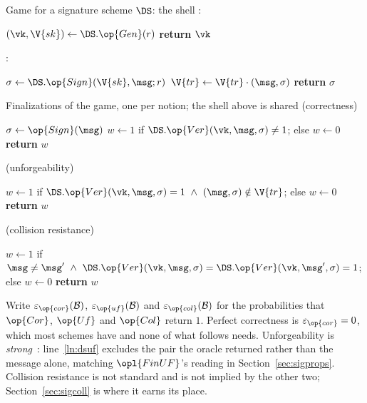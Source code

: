 \documentclass[10pt,oneside,openany]{book}
\theoremstyle{accentdef}
\theoremstyle{accentplain}
\begin{document}
\begin{procedure}{Game for a signature scheme $\DS$: the shell}
:
\begin{algorithmic}[1]
\setcounter{contline}{0}\algcont
\State $(\vk,\V{sk}) \gets \DS.\op{Gen}(r)$  \label{ln:dsgen}
\State \textbf{return} $\vk$
\algsave
\end{algorithmic}
\vspace{1.4ex}

:
\begin{algorithmic}[1]
\algcont
\State $\sigma \gets \DS.\op{Sign}(\V{sk},\msg;r)$  \label{ln:dssign}
\State $\V{tr} \gets \V{tr} \cdot (\msg,\sigma)$
\State \textbf{return} $\sigma$
\algsave
\end{algorithmic}
\end{procedure}

\begin{procedure}{Finalizations of the game, one per notion; the shell above is shared}
 \quad (correctness)
\begin{algorithmic}[1]
\algcont
\State $\sigma \gets \op{Sign}(\msg)$
\State $w \gets 1$ if $\DS.\op{Ver}(\vk,\msg,\sigma) \neq 1$; \quad else $w \gets 0$ \label{ln:dscor}
\State \textbf{return} $w$
\algsave
\end{algorithmic}
\vspace{1.4ex}

 \quad (unforgeability)
\begin{algorithmic}[1]
\algcont
\State $w \gets 1$ if $\DS.\op{Ver}(\vk,\msg,\sigma) = 1 \ \wedge\ (\msg,\sigma) \notin \V{tr}$;
       \quad else $w \gets 0$ \label{ln:dsuf}
\State \textbf{return} $w$
\algsave
\end{algorithmic}
\vspace{1.4ex}

 \quad (collision resistance)
\begin{algorithmic}[1]
\algcont
\State $w \gets 1$ if $\msg \neq \msg' \ \wedge\ \DS.\op{Ver}(\vk,\msg,\sigma) =
       \DS.\op{Ver}(\vk,\msg',\sigma) = 1$; \quad else $w \gets 0$ \label{ln:dscol}
\State \textbf{return} $w$
\algsave
\end{algorithmic}
\end{procedure}

Write $\varepsilon_{\op{cor}}(\mathcal{B})$, $\varepsilon_{\op{uf}}(\mathcal{B})$ and
$\varepsilon_{\op{col}}(\mathcal{B})$ for the probabilities that $\op{Cor}$, $\op{Uf}$ and
$\op{Col}$ return $1$. Perfect correctness is $\varepsilon_{\op{cor}} = 0$, which most schemes
have and none of what follows needs. Unforgeability is \emph{strong}~\cite{ADR02}: line~\ref{ln:dsuf} excludes
the pair the oracle returned rather than the message alone, matching $\opl{FinUF}$'s reading in
Section~\ref{sec:sigprops}. Collision resistance is not standard and is not implied by the other
two; Section~\ref{sec:sigcoll} is where it earns its place.
\end{document}
